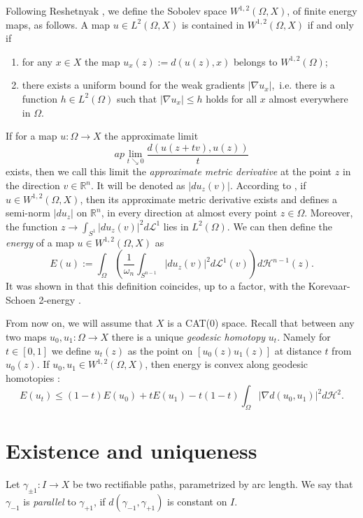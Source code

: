 \documentclass[a4paper,10pt]{amsart}
\begin{document}
Following Reshetnyak \cite{R}, we define the Sobolev space $W^{1,2}(\Omega,X)$, of finite energy maps, as follows. 
A map $u\in L^2(\Omega,X)$ is contained in $W^{1,2}(\Omega,X)$ if and only if

\begin{enumerate}
 \item for any $x\in X$ the map $u_x(z):=d(u(z),x)$ belongs to $W^{1,2}(\Omega)$;
 \item there exists a uniform bound for the weak gradients $|\nabla u_x|$,\ i.e. there is a function $h\in L^2(\Omega)$ 
 such that $|\nabla u_x|\leq h$ holds for all $x$ almost everywhere in $\Omega$. 
\end{enumerate}

If for a map $u:\Omega\to X$ the  approximate limit
$$
ap\lim_{t\searrow 0}\frac{d(u(z+tv),u(z))}{t}
$$
exists, then we call this limit the {\em approximate metric derivative} at the point $z$ in the direction $v\in\mathbb{R}^n$. It will be denoted
as $|du_z(v)|$. According to
\cite[Prop.4.3]{LW}, if $u\in W^{1,2}(\Omega,X)$, then its approximate metric derivative exists and defines a semi-norm $|du_z|$ on $\mathbb{R}^n$, 
in every direction at almost every point $z\in\Omega$. Moreover, the function $z\to\int_{S^1}|du_z(v)|^2 d\mathcal{L}^1$ lies in $L^2(\Omega)$.
We can then define the {\em energy} of a map $u\in W^{1,2}(\Omega,X)$ as
$$
E(u):=\int_\Omega\left(\frac{1}{\omega_n}\int_{S^{n-1}}|du_z(v)|^2 d\mathcal{L}^1(v)\right)d\mathcal{H}^{n-1}(z).
$$
It was shown in \cite{LW} that this definition coincides, up to a factor, with the Korevaar-Schoen 2-energy \cite{KS}.

From now on, we will assume that $X$ is a CAT(0) space. Recall that between any two maps $u_0,u_1:\Omega\to X$ there is 
a unique {\em geodesic homotopy} $u_t$. Namely for $t\in[0,1]$ we define $u_t(z)$ as the point on $[u_0(z)u_1(z)]$ at distance $t$
from $u_0(z)$. If $u_0, u_1\in W^{1,2}(\Omega,X)$, then energy is convex along geodesic homotopies \cite[(2.2vi)]{KS}:
$$
E(u_t)\leq (1-t)E(u_0)+tE(u_1)-t(1-t)\int_\Omega|\nabla d(u_0,u_1)|^2d\mathcal{H}^2.
$$




\section{Existence and uniqueness}

Let $\gamma_{\pm 1}:I\to X$ be two rectifiable paths, parametrized by arc length. We say that  $\gamma_{-1}$ is {\em parallel} to $\gamma_{+1}$, if $d(\gamma_{-1},\gamma_{+1})$
is constant on $I$.
\end{document}
